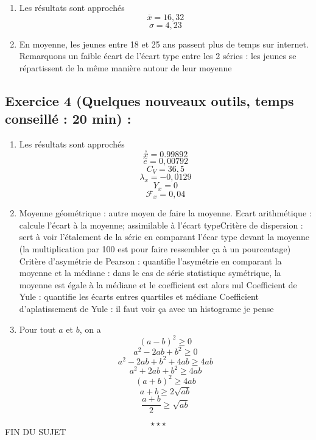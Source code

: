 \begin{enumerate}
\item Les résultats sont approchés 
$$\boxed{\overline{x} = 16,32}$$
$$\boxed{\sigma = 4,23}$$
\item En moyenne, les jeunes entre 18 et 25 ans passent plus de temps sur internet. Remarquons un faible écart de l'écart type entre les 2 séries : les jeunes se répartissent de la même manière autour de leur moyenne
\end{enumerate}
\subsection*{Exercice 4 (Quelques nouveaux outils, temps conseillé : 20 min) : }

\begin{enumerate}
\item Les résultats sont approchés
$$\boxed{\overset{\circ}{x} = 0.99892}$$
$$\boxed{\overset{\sim}{e} = 0,00792}$$
$$\boxed{C_V = 36,5}$$
$$\boxed{\lambda_x = -0,0129}$$
$$\boxed{Y_x = 0}$$
$$\boxed{\mathscr{F}_x = 0,04}$$
\item Moyenne géométrique : autre moyen de faire la moyenne. \newline Ecart arithmétique : calcule l'écart à la moyenne; assimilable à l'écart type\newline Critère de dispersion : sert à voir l'étalement de la série en comparant l'écar type devant la moyenne (la multiplication par 100 est pour faire ressembler ça à un pourcentage) \newline Critère d'asymétrie de Pearson : quantifie l'asymétrie en comparant la moyenne et la médiane : dans le cas de série statistique symétrique, la moyenne est égale à la médiane et le coefficient est alors nul \newline Coefficient de Yule : quantifie les écarts entres quartiles et médiane \newline Coefficient d'aplatissement de Yule : il faut voir ça avec un histograme je pense
\item Pour tout $a$ et $b$, on a
$$(a-b)^2 \geq 0$$
$$a^2 - 2ab + b^2 \geq 0$$
$$a^2 - 2ab + b^2 +4ab \geq 4ab$$
$$a^2 + 2ab + b^2 \geq 4ab$$
$$(a+b)^2 \geq 4ab$$
$$a+b \geq 2 \sqrt{ab}$$
$$\frac{a+b}{2} \geq \sqrt{ab}$$ 
\end{enumerate}
$$\star \star \star$$
\center
FIN DU SUJET
